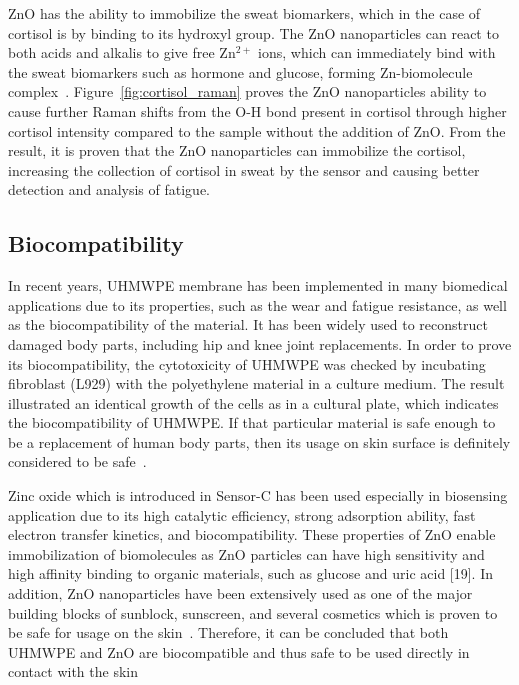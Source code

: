 \documentclass[journal]{IEEEtran}
\begin{document}
ZnO has the ability to immobilize the sweat biomarkers, which in the case of cortisol is by binding to its hydroxyl group. The ZnO nanoparticles can react to both acids and alkalis to give free Zn$^{2+}$ ions, which can immediately bind with the sweat biomarkers such as hormone and glucose, forming Zn-biomolecule complex~\cite{PropertiesZnO}. Figure~\ref{fig:cortisol_raman} proves the ZnO nanoparticles ability to cause further Raman shifts from the O-H bond present in cortisol through higher cortisol intensity compared to the sample without the addition of ZnO. From the result, it is proven that the ZnO nanoparticles can immobilize the cortisol, increasing the collection of cortisol in sweat by the sensor and causing better detection and analysis of fatigue. 

\subsection{Biocompatibility}

In recent years, UHMWPE membrane has been implemented in many biomedical applications due to its properties, such as the wear and fatigue resistance, as well as the biocompatibility of the material. It has been widely used to reconstruct damaged body parts, including hip and knee joint replacements. In order to prove its biocompatibility, the cytotoxicity of UHMWPE was checked by incubating fibroblast (L929) with the polyethylene material in a culture medium. The result illustrated an identical growth of the cells as in a cultural plate, which indicates the biocompatibility of UHMWPE. If that particular material is safe enough to be a replacement of human body parts, then its usage on skin surface is definitely considered to be safe~\cite{UHMWPEBiocompatibility}. 

Zinc oxide which is introduced in Sensor-C has been used especially in biosensing application due to its high catalytic efficiency, strong adsorption ability, fast electron transfer kinetics, and biocompatibility. These properties of ZnO enable immobilization of biomolecules as ZnO particles can have high sensitivity and high affinity binding to organic materials, such as glucose and uric acid [19]. In addition, ZnO nanoparticles have been extensively used as one of the major building blocks of sunblock, sunscreen, and several cosmetics which is proven to be safe for usage on the skin~\cite{ZnO}. Therefore, it can be concluded that both UHMWPE and ZnO are biocompatible and thus safe to be used directly in contact with the skin
\end{document}
